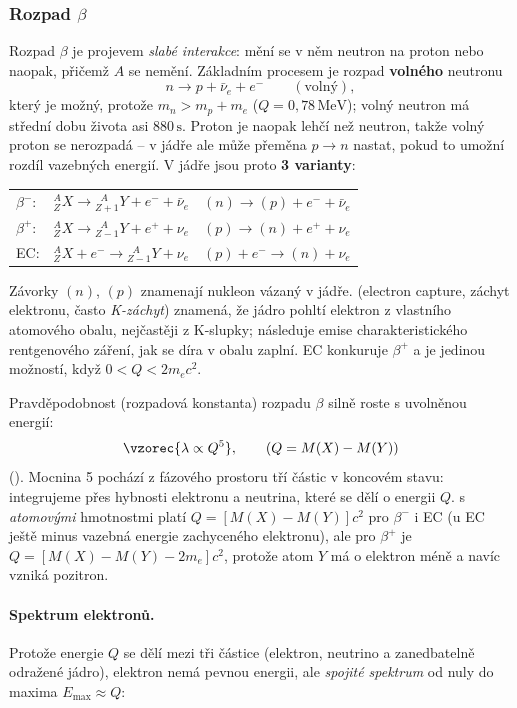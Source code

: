\subsubsection{Rozpad \texorpdfstring{\(\beta\)}{beta}}

Rozpad \(\beta\) je projevem \emph{slabé interakce}: mění se v něm neutron na proton nebo naopak, přičemž \(A\) se nemění.
Základním procesem je rozpad \textbf{volného} neutronu
\[
  n \to p + \bar\nu_e + e^- \qquad(\text{volný}),
\]
který je možný, protože \(m_n > m_p + m_e\) (\(Q = 0{,}78\,\mathrm{MeV}\)); volný neutron má střední dobu života asi
\(880\,\mathrm{s}\). Proton je naopak lehčí než neutron, takže volný proton se nerozpadá -- v jádře ale může přeměna
\(p\to n\) nastat, pokud to umožní rozdíl vazebných energií. V jádře jsou proto \textbf{3 varianty}:
\begin{center}
\renewcommand{\arraystretch}{1.4}
\begin{tabular}{lll}
  \(\beta^-\): & \({}^A_Z X \to {}^{\;\;A}_{Z+1} Y + e^- + \bar\nu_e\) & \((n) \to (p) + e^- + \bar\nu_e\)\\
  \(\beta^+\): & \({}^A_Z X \to {}^{\;\;A}_{Z-1} Y + e^+ + \nu_e\) & \((p) \to (n) + e^+ + \nu_e\)\\
  EC:          & \({}^A_Z X + e^- \to {}^{\;\;A}_{Z-1} Y + \nu_e\) & \((p) + e^- \to (n) + \nu_e\)
\end{tabular}
\end{center}
Závorky \((n)\), \((p)\) znamenají nukleon vázaný v jádře.  (electron capture, záchyt elektronu, často \emph{K-záchyt})
znamená, že jádro pohltí elektron z vlastního atomového obalu, nejčastěji z K-slupky; následuje emise charakteristického
rentgenového záření, jak se díra v obalu zaplní. EC konkuruje \(\beta^+\) a je jedinou možností, když
\(0 < Q < 2m_ec^2\).

Pravděpodobnost (rozpadová konstanta) rozpadu \(\beta\) silně roste s uvolněnou energií:
\[
  \vzorec{\lambda \propto Q^5}, \qquad \left(Q = M(X) - M(Y)\right)
\]
(). Mocnina 5 pochází z fázového prostoru tří částic v koncovém stavu: integrujeme přes hybnosti elektronu
a neutrina, které se dělí o energii \(Q\).
 s \emph{atomovými} hmotnostmi platí \(Q=[M(X)-M(Y)]c^2\) pro \(\beta^-\) i EC
(u EC ještě minus vazebná energie zachyceného elektronu), ale pro \(\beta^+\) je
\(Q = [M(X)-M(Y)-2m_e]c^2\), protože atom \(Y\) má o elektron méně a navíc vzniká pozitron.

\paragraph{Spektrum elektronů.} Protože energie \(Q\) se dělí mezi tři částice (elektron, neutrino a zanedbatelně odražené jádro),
elektron nemá pevnou energii, ale \emph{spojité spektrum} od nuly do maxima \(E_\text{max}\approx Q\):

